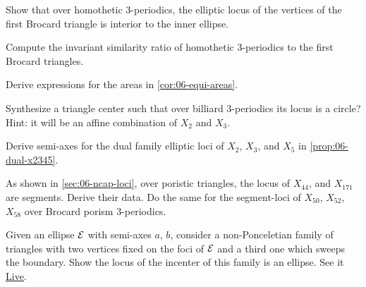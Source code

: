 \begin{exercise}
Show that over homothetic 3-periodics, the elliptic locus of the vertices of the first Brocard triangle is interior to the inner ellipse.
\end{exercise}

\begin{exercise}
Compute the invariant similarity ratio of homothetic 3-periodics to the first Brocard triangles. 
\end{exercise}

\begin{exercise}
Derive expressions for the areas in \cref{cor:06-equi-areas}.
\end{exercise}

\begin{exercise}
Synthesize a triangle center such that over billiard 3-periodics its locus is a circle? Hint: it will be an affine combination of $X_2$ and $X_3$.
\end{exercise}

\begin{exercise}
Derive semi-axes for the dual family elliptic loci of $X_2$, $X_3$, and $X_5$ in \cref{prop:06-dual-x2345}.
\end{exercise}

\begin{exercise}
As shown in \cref{sec:06-ncap-loci}, over poristic triangles, the locus of $X_{44}$, and $X_{171}$ are segments. Derive their data. Do the same for the segment-loci of $X_{50}$, $X_{52}$, $X_{58}$ over Brocard porism 3-periodics.
\end{exercise}

\begin{exercise}
Given an ellipse $\mathcal{E}$ with semi-axes $a$, $b$, consider a non-Ponceletian family of triangles with two vertices fixed on the foci of $\mathcal{E}$ and a third one which sweeps the boundary. Show the locus of the incenter of this family is an ellipse. See it \href{https://bit.ly/3up4a6V}{Live}.
\end{exercise}

